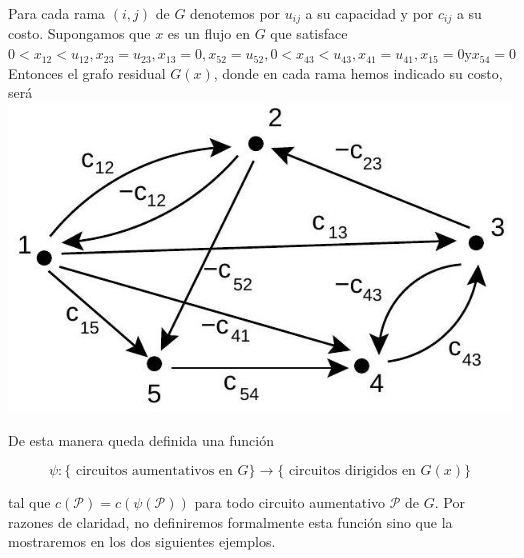 \documentclass[10pt]{article}
\begin{document}
Para cada rama $(i, j)$ de $G$ denotemos por $u_{i j}$ a su capacidad y por $c_{i j}$ a su costo. Supongamos que $x$ es un flujo en $G$ que satisface $0<x_{12}<u_{12}, x_{23}=u_{23}, x_{13}=0, x_{52}=u_{52}, 0<x_{43}<u_{43}, x_{41}=u_{41}, x_{15}=0 \mathrm{y} x_{54}=0$ Entonces el grafo residual $G(x)$, donde en cada rama hemos indicado su costo, será\\
\includegraphics[max width=\textwidth, center]{2025_09_05_955b52bfc43174a24a9ag-13(3)}

De esta manera queda definida una función

$$
\psi:\{\text { circuitos aumentativos en } G\} \longrightarrow\{\text { circuitos dirigidos en } G(x)\}
$$

tal que $c(\mathcal{P})=c(\psi(\mathcal{P}))$ para todo circuito aumentativo $\mathcal{P}$ de $G$. Por razones de claridad, no definiremos formalmente esta función sino que la mostraremos en los dos siguientes ejemplos.
\end{document}
